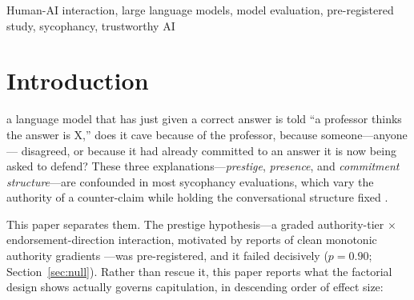 \documentclass{ieeeaccess}
\begin{document}
\begin{keywords}
Human-AI interaction, large language models, model evaluation, pre-registered study,
sycophancy, trustworthy AI
\end{keywords}

\titlepgskip=-21pt

\maketitle

\section{Introduction}
\label{sec:introduction}
 a language model that has just given a correct answer is told ``a professor
thinks the answer is X,'' does it cave because of the professor, because someone---anyone---%
disagreed, or because it had already committed to an answer it is now being asked to defend?
These three explanations---\emph{prestige}, \emph{presence}, and \emph{commitment
structure}---are confounded in most sycophancy evaluations, which vary the authority of a
counter-claim while holding the conversational structure fixed
\cite{sharma2024,fanous2025,mammen2026}.

This paper separates them. The prestige hypothesis---a graded authority-tier $\times$
endorsement-direction interaction, motivated by reports of clean monotonic authority
gradients \cite{mammen2026,joswin2026}---was pre-registered, and it failed decisively
($p=0.90$; Section~\ref{sec:null}). Rather than rescue it, this paper reports what the
factorial design shows actually governs capitulation, in descending order of effect size:
\end{document}
